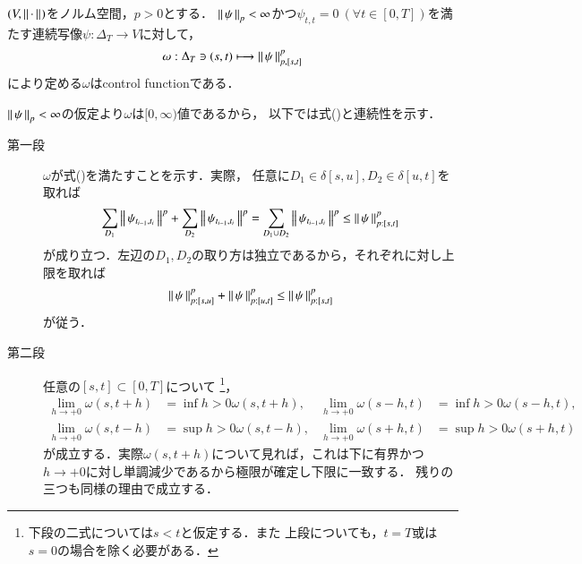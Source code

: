 	\begin{screen}
		\begin{thm}
			$(V,\left\|\, \cdot\, \right\|_{})$をノルム空間，$p > 0$とする．
			$\left\|\, \psi\, \right\|_{p} < \infty$かつ$\psi_{t,t} = 0\ (\forall t \in [0,T])$を満たす連続写像$\psi:\Delta_T \longrightarrow V$に対して，
			\begin{align}
				\omega:\Delta_T \ni (s,t) \longmapsto \left\|\, \psi\, \right\|_{p,[s,t]}^p
			\end{align}
			により定める$\omega$はcontrol functionである．
		\end{thm}
	\end{screen}
	
	\begin{prf}
		$\left\|\, \psi\, \right\|_{p} < \infty$の仮定より$\omega$は$[0,\infty)$値であるから，
		以下では式()と連続性を示す．
		\begin{description}
			\item[第一段]
				$\omega$が式()を満たすことを示す．実際，
				任意に$D_1 \in \delta[s,u],D_2 \in \delta[u,t]$を取れば
				\begin{align}
					\sum_{D_1}\left\|\, \psi_{t_{i-1},t_i}\, \right\|_{}^p
					+ \sum_{D_2}\left\|\, \psi_{t_{i-1},t_i}\, \right\|_{}^p
					= \sum_{D_1 \cup D_2}\left\|\, \psi_{t_{i-1},t_i}\, \right\|_{}^p
					\leq \left\|\, \psi\, \right\|_{p:[s,t]}^p
				\end{align}
				が成り立つ．左辺の$D_1,D_2$の取り方は独立であるから，それぞれに対し上限を取れば
				\begin{align}
					\left\|\, \psi\, \right\|_{p:[s,u]}^p + \left\|\, \psi\, \right\|_{p:[u,t]}^p
					\leq \left\|\, \psi\, \right\|_{p:[s,t]}^p
				\end{align}
				が従う．
			\item[第二段]
				任意の$[s,t] \subset [0,T]$について
				\footnote{
					下段の二式については$s < t$と仮定する．また
					上段についても，$t=T$或は$s=0$の場合を除く必要がある．
				}，
				\begin{align}
					\lim_{h \to +0} \omega(s,t+h) &= \inf{h>0}{\omega(s,t+h)},
					&\lim_{h \to +0} \omega(s-h,t) &= \inf{h>0}{\omega(s-h,t)}, \\
					\lim_{h \to +0} \omega(s,t-h) &= \sup{h>0}{\omega(s,t-h)},
					&\lim_{h \to +0} \omega(s+h,t) &= \sup{h>0}{\omega(s+h,t)}
				\end{align}
				が成立する．実際$\omega(s,t+h)$について見れば，これは下に有界かつ
				$h \to +0$に対し単調減少であるから極限が確定し下限に一致する．
				残りの三つも同様の理由で成立する．
				

\end{description}
\end{prf}
